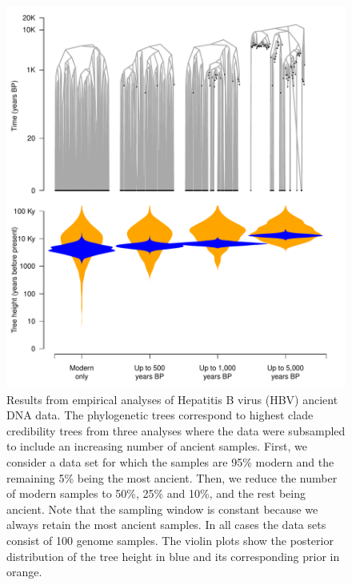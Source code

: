 \documentclass[11pt]{article}
\begin{document}
\begin{figure}[H]
    \begin{center}
        \includegraphics[scale=0.7, angle=0]{empirical_results_tree_height.pdf}
        \caption{Results from empirical analyses of Hepatitis B virus (HBV) ancient DNA data. The phylogenetic trees correspond to highest clade credibility trees from three analyses where the data were subsampled to include an increasing number of ancient samples. First, we consider a data set for which the samples are 95\% modern and the remaining 5\% being the most ancient. Then, we reduce the number of modern samples to 50\%, 25\% and 10\%, and the rest being ancient. Note that the sampling window is constant because we always retain the most ancient samples. In all cases the data sets consist of 100 genome samples. The violin plots show the posterior distribution of the tree height in blue and its corresponding prior in orange.}
        \label{figure:Fig3}
    \end{center}
\end{figure}
\end{document}
